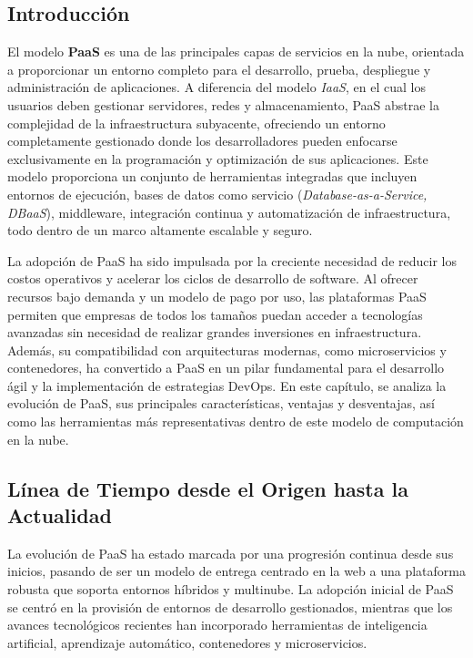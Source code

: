 {        \subsection{Introducción}
            El modelo \textbf{PaaS} es una de las principales capas de servicios en la nube, orientada a proporcionar un entorno completo para el desarrollo, prueba, despliegue y administración de aplicaciones. A diferencia del modelo \textit{IaaS}, en el cual los usuarios deben gestionar servidores, redes y almacenamiento, PaaS abstrae la complejidad de la infraestructura subyacente, ofreciendo un entorno completamente gestionado donde los desarrolladores pueden enfocarse exclusivamente en la programación y optimización de sus aplicaciones. Este modelo proporciona un conjunto de herramientas integradas que incluyen entornos de ejecución, bases de datos como servicio (\textit{Database-as-a-Service, DBaaS}), middleware, integración continua y automatización de infraestructura, todo dentro de un marco altamente escalable y seguro.
            
            La adopción de PaaS ha sido impulsada por la creciente necesidad de reducir los costos operativos y acelerar los ciclos de desarrollo de software. Al ofrecer recursos bajo demanda y un modelo de pago por uso, las plataformas PaaS permiten que empresas de todos los tamaños puedan acceder a tecnologías avanzadas sin necesidad de realizar grandes inversiones en infraestructura. Además, su compatibilidad con arquitecturas modernas, como microservicios y contenedores, ha convertido a PaaS en un pilar fundamental para el desarrollo ágil y la implementación de estrategias DevOps. En este capítulo, se analiza la evolución de PaaS, sus principales características, ventajas y desventajas, así como las herramientas más representativas dentro de este modelo de computación en la nube.
            
        \subsection{Línea de Tiempo desde el Origen hasta la Actualidad}
            La evolución de PaaS ha estado marcada por una progresión continua desde sus inicios, pasando de ser un modelo de entrega centrado en la web a una plataforma robusta que soporta entornos híbridos y multinube. La adopción inicial de PaaS se centró en la provisión de entornos de desarrollo gestionados, mientras que los avances tecnológicos recientes han incorporado herramientas de inteligencia artificial, aprendizaje automático, contenedores y microservicios.
            
}
